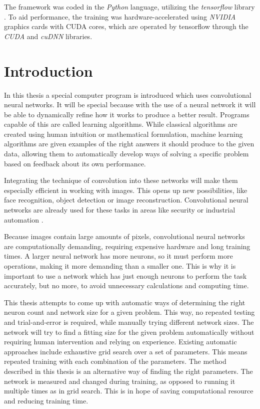 \documentclass[12pt]{report}
\begin{document}
The framework was coded in the \textit{Python} language, utilizing the \textit{tensorflow} library \cite{tensorflow2015-whitepaper}. To aid performance, the training was hardware-accelerated using \textit{NVIDIA} graphics cards with CUDA cores, which are operated by tensorflow through the \textit{CUDA} and \textit{cuDNN} libraries.

\chapter*{Introduction}

In this thesis a special computer program is introduced which uses convolutional neural networks. It will be special because with the use of a neural network it will be able to dynamically refine how it works to produce a better result. Programs capable of this are called learning algorithms. While classical algorithms are created using human intuition or mathematical formulation, machine learning algorithms are given examples of the right answers it should produce to the given data, allowing them to automatically develop ways of solving a specific problem based on feedback about its own performance.

Integrating the technique of convolution into these networks will make them especially efficient in working with images. This opens up new possibilities, like face recognition, object detection or image reconstruction. Convolutional neural networks are already used for these tasks in areas like security or industrial automation \cite{applications}.

Because images contain large amounts of pixels, convolutional neural networks are computationally demanding, requiring expensive hardware and long training times. A larger neural network has more neurons, so it must perform more operations, making it more demanding than a smaller one. This is why it is important to use a network which has just enough neurons to perform the task accurately, but no more, to avoid unnecessary calculations and computing time.

This thesis attempts to come up with automatic ways of determining the right neuron count and network size for a given problem. This way, no repeated testing and trial-and-error is required, while manually trying different network sizes. The network will try to find a fitting size for the given problem automatically without requiring human intervention and relying on experience. Existing automatic approaches include exhaustive grid search over a set of parameters. This means repeated training with each combination of the parameters. The method described in this thesis is an alternative way of finding the right parameters. The network is measured and changed during training, as opposed to running it multiple times as in grid search. This is in hope of saving computational resource and reducing training time.
\end{document}

